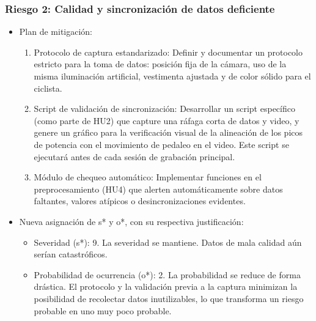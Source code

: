 \documentclass[
11pt, %
]{charter}
\begin{document}
\subsubsection*{Riesgo 2: Calidad y sincronización de datos deficiente}
\begin{itemize}
    \item Plan de mitigación:
    \begin{enumerate}
        \item Protocolo de captura estandarizado: Definir y documentar un protocolo estricto para la toma de datos: posición fija de la cámara, uso de la misma iluminación artificial, vestimenta ajustada y de color sólido para el ciclista.
        \item Script de validación de sincronización: Desarrollar un script específico (como parte de HU2) que capture una ráfaga corta de datos y video, y genere un gráfico para la verificación visual de la alineación de los picos de potencia con el movimiento de pedaleo en el video. Este script se ejecutará antes de cada sesión de grabación principal.
        \item Módulo de chequeo automático: Implementar funciones en el preprocesamiento (HU4) que alerten automáticamente sobre datos faltantes, valores atípicos o desincronizaciones evidentes.
    \end{enumerate}
    \item Nueva asignación de s* y o*, con su respectiva justificación:
    \begin{itemize}
        \item Severidad (s*): 9. La severidad se mantiene. Datos de mala calidad aún serían catastróficos.
        \item Probabilidad de ocurrencia (o*): 2. La probabilidad se reduce de forma drástica. El protocolo y la validación previa a la captura minimizan la posibilidad de recolectar datos inutilizables, lo que transforma un riesgo probable en uno muy poco probable.
    \end{itemize}
\end{itemize}
\end{document}
